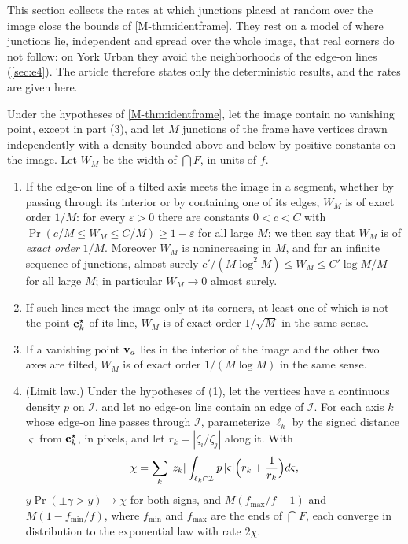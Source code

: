 This section collects the rates at which junctions placed at random over the image close the bounds of \cref{M-thm:identframe}. They rest on a model of where junctions lie, independent and spread over the whole image, that real corners do not follow: on York Urban they avoid the neighborhoods of the edge-on lines (\cref{sec:e4}). The article therefore states only the deterministic results, and the rates are given here.

\begin{proposition}\label{prop:rate}
Under the hypotheses of \cref{M-thm:identframe}, let the image contain no vanishing point, except in part (3), and let $M$ junctions of the frame have vertices drawn independently with a density bounded above and below by positive constants on the image. Let $W_M$ be the width of $\bigcap F$, in units of $f$.
\begin{enumerate}
\item If the edge-on line of a tilted axis meets the image in a segment, whether by passing through its interior or by containing one of its edges, $W_M$ is of exact order $1/M$: for every $\varepsilon>0$ there are constants $0<c<C$ with $\Pr(c/M\le W_M\le C/M)\ge1-\varepsilon$ for all large $M$; we then say that $W_M$ is of \emph{exact order} $1/M$. Moreover $W_M$ is nonincreasing in $M$, and for an infinite sequence of junctions, almost surely $c'/(M\log^2M)\le W_M\le C'\log M/M$ for all large $M$; in particular $W_M\to0$ almost surely.
\item If such lines meet the image only at its corners, at least one of which is not the point $\mathbf{c}^{\star}_k$ of its line, $W_M$ is of exact order $1/\sqrt M$ in the same sense.
\item If a vanishing point $\mathbf{v}_a$ lies in the interior of the image and the other two axes are tilted, $W_M$ is of exact order $1/(M\log M)$ in the same sense.
\item (Limit law.) Under the hypotheses of (1), let the vertices have a continuous density $p$ on $\mathcal I$, and let no edge-on line contain an edge of $\mathcal I$. For each axis $k$ whose edge-on line passes through $\mathcal I$, parameterize $\ell_k$ by the signed distance $\varsigma$ from $\mathbf{c}^{\star}_k$, in pixels, and let $r_k=|\zeta_i/\zeta_j|$ along it. With
\[
\chi=\sum_k|z_k|\int_{\ell_k\cap \mathcal I}p\,|\varsigma|\Bigl(r_k+\frac1{r_k}\Bigr)d\varsigma ,
\]
$y\Pr(\pm\gamma>y)\to\chi$ for both signs, and $M(f_{\max}/f-1)$ and $M(1-f_{\min}/f)$, where $f_{\min}$ and $f_{\max}$ are the ends of $\bigcap F$, each converge in distribution to the exponential law with rate $2\chi$.
\end{enumerate}
\end{proposition}
